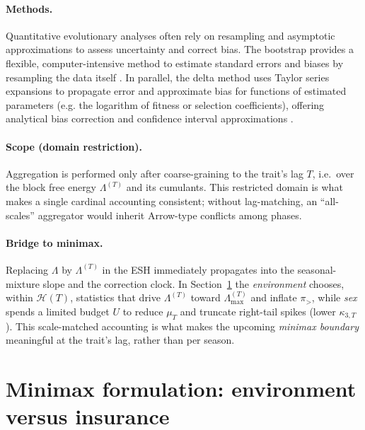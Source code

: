 \documentclass[11pt]{article}
\theoremstyle{upright}
\newcommand{\hazT}[1]{\Lambda^{(#1)}}          %
\begin{document}
\paragraph{Methods.}
Quantitative evolutionary analyses often rely on resampling and asymptotic approximations to assess uncertainty and correct bias. The bootstrap provides a flexible, computer-intensive method to estimate standard errors and biases by resampling the data itself \citep{Efron1979}. In parallel, the delta method uses Taylor series expansions to propagate error and approximate bias for functions of estimated parameters (e.g. the logarithm of fitness or selection coefficients), offering analytical bias correction and confidence interval approximations \citep{Casella2002}.

\paragraph{Scope (domain restriction).}
Aggregation is performed only after coarse-graining to the trait’s lag $T$, i.e.\ over the
block free energy $\hazT{T}$ and its cumulants. This restricted domain is what makes a
single cardinal accounting consistent; without lag-matching, an “all-scales” aggregator would
inherit Arrow-type conflicts among phases.

\paragraph{Bridge to minimax.}
Replacing $\Lambda$ by $\hazT{T}$ in the ESH immediately propagates into the seasonal-mixture slope and the correction clock. In Section~\ref{sec:minimax} the \emph{environment} chooses, within $\mathcal H(T)$, statistics that drive $\hazT{T}$ toward $\hazT{T}_{\max}$ and inflate $\pi_{>}$, while \emph{sex} spends a limited budget $U$ to reduce $\mu_T$ and truncate right-tail spikes (lower $\kappa_{3,T}$). This scale-matched accounting is what makes the upcoming \emph{minimax boundary}  meaningful at the trait’s lag, rather than per season.

\section{Minimax formulation: environment versus insurance}
\label{sec:minimax}
\end{document}
